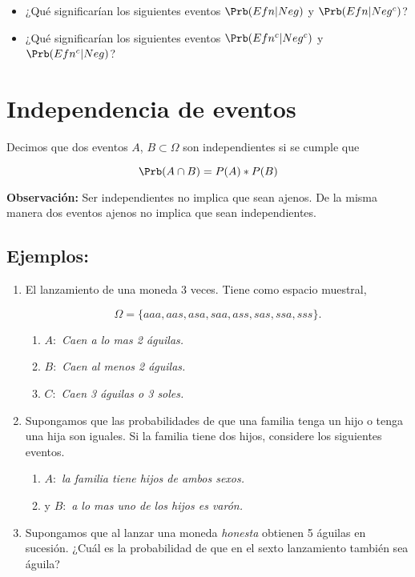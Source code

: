 \documentclass{assignment}
\begin{document}
\begin{itemize}
\item ¿Qué significarían los siguientes eventos $\Prb(Efn|Neg)$ y $\Prb(Efn|Neg^c)$?
\item ¿Qué significarían los siguientes eventos $\Prb(Efn^c|Neg^c)$ y $\Prb(Efn^c|Neg)$?
\end{itemize}



\section{Independencia de eventos}
Decimos que dos eventos $A$, $B \subset \Omega$ son independientes si se cumple que 

\[
\Prb(A \cap B) = P(A)*P(B)
\]

\textbf{Observación:}
Ser independientes no implica que sean ajenos. De la misma manera dos eventos ajenos no implica que sean independientes. 

\subsection*{Ejemplos:}

\begin{enumerate}
\item El lanzamiento de una moneda 3 veces. Tiene como espacio muestral,

\[
\Omega=\{aaa, aas, asa, saa, ass, sas, ssa, sss\}.
\]

\begin{enumerate}
	 \item $A:$ \emph{Caen a lo mas 2 águilas.}
	 \item $B:$ \emph{Caen al menos 2 águilas.}
	 \item $C:$ \emph{Caen 3 águilas o 3 soles.}
\end{enumerate}

\item Supongamos que las probabilidades de que una familia tenga un hijo o tenga una hija son iguales. Si la familia tiene dos hijos, considere los siguientes eventos. 

\begin{enumerate}
	\item $A:$ \emph{la familia tiene hijos de ambos sexos.}
	\item y $B:$ \emph{a lo mas uno de los hijos es varón.}
\end{enumerate}


	\item Supongamos que al lanzar una moneda \emph{honesta} obtienen 5 águilas en sucesión. ¿Cuál es la probabilidad de que en el sexto lanzamiento también sea águila?


\end{enumerate}
\end{document}
